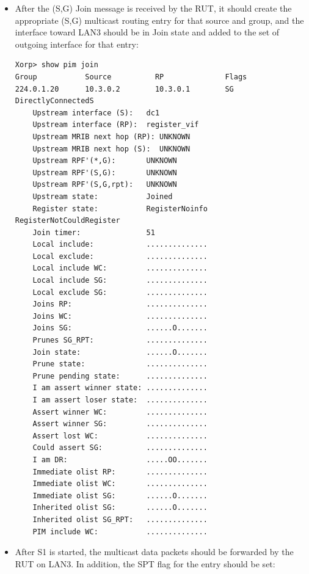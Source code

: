 \documentclass[11pt]{report}
\begin{document}
\begin{itemize}

  \item After the (S,G) Join message is received by the RUT, it
  should create the appropriate (S,G) multicast routing entry for
  that source and group, and the interface toward LAN3 should be in Join state
  and added to the set of outgoing interface for that entry:

\begin{verbatim}
Xorp> show pim join 
Group           Source          RP              Flags
224.0.1.20      10.3.0.2        10.3.0.1        SG DirectlyConnectedS 
    Upstream interface (S):   dc1
    Upstream interface (RP):  register_vif
    Upstream MRIB next hop (RP): UNKNOWN
    Upstream MRIB next hop (S):  UNKNOWN
    Upstream RPF'(*,G):       UNKNOWN
    Upstream RPF'(S,G):       UNKNOWN
    Upstream RPF'(S,G,rpt):   UNKNOWN
    Upstream state:           Joined 
    Register state:           RegisterNoinfo RegisterNotCouldRegister 
    Join timer:               51
    Local include:            ..............
    Local exclude:            ..............
    Local include WC:         ..............
    Local include SG:         ..............
    Local exclude SG:         ..............
    Joins RP:                 ..............
    Joins WC:                 ..............
    Joins SG:                 ......O.......
    Prunes SG_RPT:            ..............
    Join state:               ......O.......
    Prune state:              ..............
    Prune pending state:      ..............
    I am assert winner state: ..............
    I am assert loser state:  ..............
    Assert winner WC:         ..............
    Assert winner SG:         ..............
    Assert lost WC:           ..............
    Could assert SG:          ..............
    I am DR:                  .....OO.......
    Immediate olist RP:       ..............
    Immediate olist WC:       ..............
    Immediate olist SG:       ......O.......
    Inherited olist SG:       ......O.......
    Inherited olist SG_RPT:   ..............
    PIM include WC:           ..............
\end{verbatim}

  \item After S1 is started, the multicast data packets should be
  forwarded by the RUT on LAN3. In addition, the SPT flag for the
  entry should be set:


\end{itemize}
\end{document}
